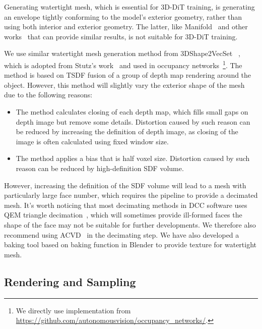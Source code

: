 Generating watertight mesh, which is essential for 3D-DiT training, is generating an envelope tightly conforming to the model's exterior geometry, 
rather than using both interior and exterior geometry. 
The latter, like Manifold~\cite{huang2018robust,huang2020manifoldplus} and other works~\cite{portaneri2022alpha} that can provide similar results, is not suitable for 3D-DiT training.

We use similar watertight mesh generation method from 3DShape2VecSet ~\cite{zhang20233dshape2vecset}, 
which is adopted from Stutz's work~\cite{stutz2020learning} and used in occupancy networks~\cite{mescheder2019occupancy}\footnote{We directly use implementation from \url{https://github.com/autonomousvision/occupancy_networks/}.}.
The method is based on TSDF fusion of a group of depth map rendering around the object.
However, this method will slightly vary the exterior shape of the mesh due to the following reasons:
\begin{itemize}
    \item The method calculates closing of each depth map, which fills small gaps on depth image but remove some details. Distortion caused by such reason can be reduced by increasing the definition of depth image, as closing of the image is often calculated using fixed window size.
    \item The method applies a bias that is half voxel size. Distortion caused by such reason can be reduced by high-definition SDF volume. 
\end{itemize}
However, increasing the definition of the SDF volume will lead to a mesh with particularly large face number, which requires the pipeline to provide a decimated mesh. 
It's worth noticing that most decimating methods in DCC software uses QEM triangle decimation~\cite{garland1997surface}, which will sometimes provide ill-formed faces \ie the shape of the face may not be suitable for further developments.
We therefore also recommend using ACVD~\cite{audette2011approach,valette2008generic,valette2004approximated} in the decimating step.
We have also developed a baking tool based on baking function in Blender to provide texture for watertight mesh.


\subsection{Rendering and Sampling}

